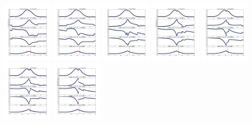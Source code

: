 \documentclass[11pt]{article}
\begin{document}
\vskip 10pt 
\includegraphics[width=0.19\textwidth]{frame0034fig1.png}
\vskip 10pt 
\includegraphics[width=0.19\textwidth]{frame0035fig1.png}
\vskip 10pt 
\includegraphics[width=0.19\textwidth]{frame0036fig1.png}
\vskip 10pt 
\includegraphics[width=0.19\textwidth]{frame0037fig1.png}
\vskip 10pt 
\includegraphics[width=0.19\textwidth]{frame0038fig1.png}
\vskip 10pt 
\includegraphics[width=0.19\textwidth]{frame0039fig1.png}
\vskip 10pt 
\includegraphics[width=0.19\textwidth]{frame0040fig1.png}
\end{document}
